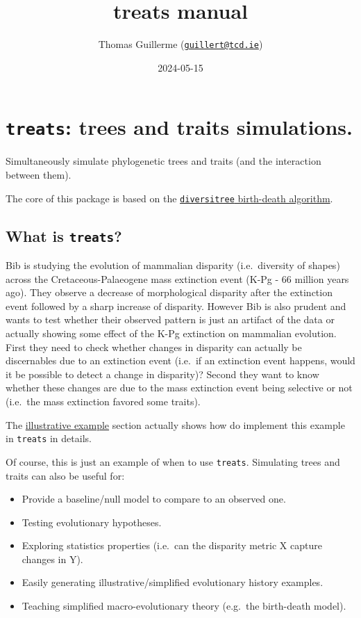 \documentclass[
]{book}
\title{treats manual}
\author{Thomas Guillerme (\href{mailto:guillert@tcd.ie}{\nolinkurl{guillert@tcd.ie}})}
\date{2024-05-15}
\providecommand{\tightlist}{%
  \setlength{\itemsep}{0pt}\setlength{\parskip}{0pt}}
\begin{document}
\maketitle

{
\setcounter{tocdepth}{1}
\tableofcontents
}
\hypertarget{treats-trees-and-traits-simulations.}{%
\chapter{\texorpdfstring{\texttt{treats}: trees and traits simulations.}{treats: trees and traits simulations.}}\label{treats-trees-and-traits-simulations.}}

Simultaneously simulate phylogenetic trees and traits (and the interaction between them).

The core of this package is based on the \href{https://github.com/cran/diversitree/blob/master/R/simulate-bd.R}{\texttt{diversitree} birth-death algorithm}.

\hypertarget{what-is-treats}{%
\section{\texorpdfstring{What is \texttt{treats}?}{What is treats?}}\label{what-is-treats}}

Bib is studying the evolution of mammalian disparity (i.e.~diversity of shapes) across the Cretaceous-Palaeogene mass extinction event (K-Pg - 66 million years ago).
They observe a decrease of morphological disparity after the extinction event followed by a sharp increase of disparity.
However Bib is also prudent and wants to test whether their observed pattern is just an artifact of the data or actually showing some effect of the K-Pg extinction on mammalian evolution.
First they need to check whether changes in disparity can actually be discernables due to an extinction event (i.e.~if an extinction event happens, would it be possible to detect a change in disparity)?
Second they want to know whether these changes are due to the mass extinction event being selective or not (i.e.~the mass extinction favored some traits).

The \protect\hyperlink{kpgexample}{illustrative example} section actually shows how do implement this example in \texttt{treats} in details.

Of course, this is just an example of when to use \texttt{treats}.
Simulating trees and traits can also be useful for:

\begin{itemize}
\tightlist
\item
  Provide a baseline/null model to compare to an observed one.
\item
  Testing evolutionary hypotheses.
\item
  Exploring statistics properties (i.e.~can the disparity metric X capture changes in Y).
\item
  Easily generating illustrative/simplified evolutionary history examples.
\item
  Teaching simplified macro-evolutionary theory (e.g.~the birth-death model).
\end{itemize}
\end{document}
